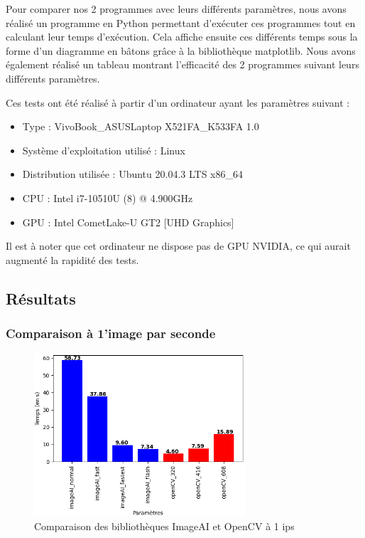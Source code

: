 Pour comparer nos 2 programmes avec leurs différents paramètres, nous avons réalisé un programme en Python permettant
d'exécuter ces programmes tout en calculant leur temps d'exécution.
Cela affiche ensuite ces différents temps sous la forme d'un diagramme en bâtons grâce à la bibliothèque matplotlib.
Nous avons également réalisé un tableau montrant l'efficacité des 2 programmes suivant leurs différents paramètres.

Ces tests ont été réalisé à partir d'un ordinateur ayant les paramètres suivant :
\begin{itemize}
    \item Type : VivoBook\_ASUSLaptop X521FA\_K533FA 1.0
    \item Système d'exploitation utilisé : Linux
    \item Distribution utilisée : Ubuntu 20.04.3 LTS x86\_64
    \item \gls{CPU} : Intel i7-10510U (8) @ 4.900GHz
    \item \gls{GPU} : Intel CometLake-U GT2 [UHD Graphics]
\end{itemize}
Il est à noter que cet ordinateur ne dispose pas de GPU NVIDIA, ce qui aurait augmenté la rapidité des tests.

\subsection{Résultats}
\label{sec:comparaisonIA:resultats}

\subsubsection{Comparaison à 1'image par seconde}
\label{sec:comparaisonIA:resultats:1fps}

\begin{figure}[H]
    \centering
    \includegraphics[width=0.7\textwidth]{img/result_1fps.png}
    \caption{Comparaison des bibliothèques ImageAI et OpenCV à 1 ips}
\end{figure}

